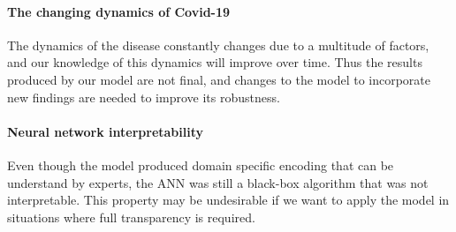 \paragraph{The changing dynamics of Covid-19}
The dynamics of the disease constantly changes due to a multitude of factors, and our knowledge of this dynamics will improve over time.
Thus the results produced by our model are not final, and changes to the model to incorporate new findings are needed to improve its robustness.

\paragraph{Neural network interpretability}
Even though the model produced domain specific encoding that can be understand by experts, the \gls{ANN} was still a black-box algorithm that was not interpretable.
This property may be undesirable if we want to apply the model in situations where full transparency is required.
